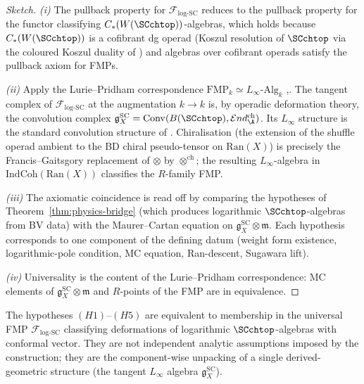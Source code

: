 \begin{proof}[Sketch]
\emph{(i)} The pullback property for $\mathcal{F}_{\mathrm{log\text{-}SC}}$
reduces to the pullback property for the functor classifying
$C_\ast(W(\SCchtop))$-algebras, which holds because
$C_\ast(W(\SCchtop))$ is a cofibrant dg operad (Koszul resolution
of $\SCchtop$ via the coloured Koszul duality of
\cite{FG12,HA}) and algebras over cofibrant operads satisfy the
pullback axiom for FMPs.

\emph{(ii)} Apply the Lurie--Pridham correspondence
$\mathrm{FMP}_k \simeq L_\infty\text{-}\mathrm{Alg}_k$
\cite[Thm.~2.2.4]{Pridham},\cite[Thm.~15.3.4.2]{HA}. The
tangent complex of $\mathcal{F}_{\mathrm{log\text{-}SC}}$ at the
augmentation $k \to k$ is, by operadic deformation theory, the
convolution complex
$\mathfrak g^{\mathrm{SC}}_X =
\mathrm{Conv}(B(\SCchtop), \mathcal{E}nd_\A^{\mathrm{ch}})$.
Its $L_\infty$ structure is the standard convolution structure
of \cite{LV12}. Chiralisation (the extension of the shuffle
operad ambient to the BD chiral pseudo-tensor on $\mathrm{Ran}(X)$)
is precisely the Francis--Gaitsgory \cite{FG12} replacement of
$\otimes$ by $\otimes^{\mathrm{ch}}$; the resulting
$L_\infty$-algebra in $\mathrm{IndCoh}(\mathrm{Ran}(X))$
classifies the $R$-family FMP.

\emph{(iii)} The axiomatic coincidence is read off by comparing
the hypotheses of Theorem~\ref{thm:physics-bridge} (which
produces logarithmic $\SCchtop$-algebras from BV data) with the
Maurer--Cartan equation on
$\mathfrak g^{\mathrm{SC}}_X \otimes \mathfrak m$. Each
hypothesis corresponds to one component of the defining datum
(weight form existence, logarithmic-pole condition, MC equation,
Ran-descent, Sugawara lift).

\emph{(iv)} Universality is the content of the Lurie--Pridham
correspondence: MC elements of $\mathfrak g^{\mathrm{SC}}_X
\otimes \mathfrak m$ and $R$-points of the FMP are in
equivalence.
\end{proof}

\begin{corollary}
\label{cor:h-axioms-universal}
The hypotheses $(H1)$--$(H5)$ are equivalent to membership in the
universal FMP $\mathcal{F}_{\mathrm{log\text{-}SC}}$ classifying
deformations of logarithmic $\SCchtop$-algebras with conformal
vector. They are not independent analytic assumptions imposed by
the construction; they are the component-wise unpacking of a
single derived-geometric structure (the tangent $L_\infty$ algebra
$\mathfrak g^{\mathrm{SC}}_X$).
\end{corollary}

